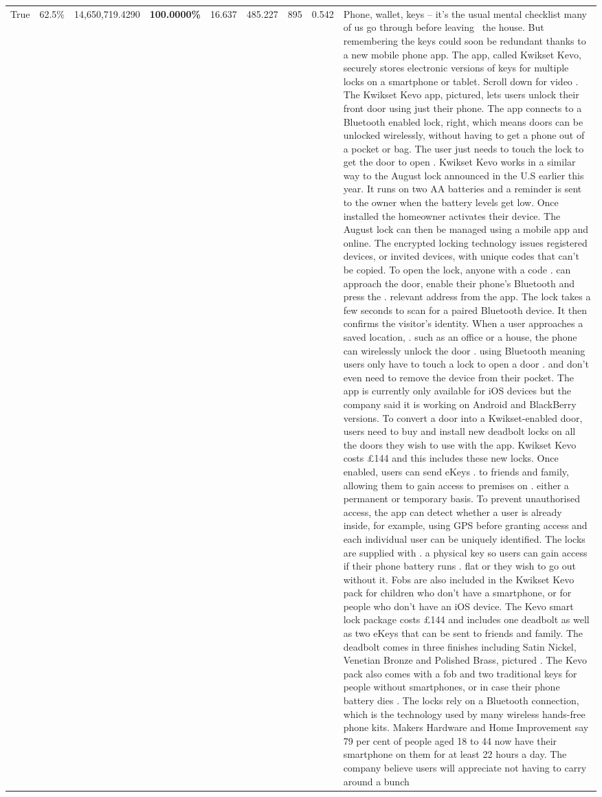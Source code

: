 \begin{table}[H]
\begin{tabular}{lllrlllll}
True & 62.5\% & 14,650,719.4290 & \bfseries \color{red} 100.0000\% & 16.637 & 485.227 & 895 & 0.542 & Phone, wallet, keys – it’s the usual mental checklist many of us go through before leaving  the house. But remembering the keys could soon be redundant thanks to a new mobile phone app. The app, called Kwikset Kevo, securely stores electronic versions of keys for multiple locks on a smartphone or tablet. Scroll down for video . The Kwikset Kevo app, pictured, lets users unlock their front door using just their phone. The app connects to a Bluetooth enabled lock, right, which means doors can be unlocked wirelessly, without having to get a phone out of a pocket or bag. The user just needs to touch the lock to get the door to open . Kwikset Kevo works in a similar way to the August lock announced in the U.S earlier this year. It runs on two AA batteries and a reminder is sent to the owner when the battery levels get low. Once installed the homeowner activates their device. The August lock can then be managed using a mobile app and online. The encrypted locking technology issues registered devices, or invited devices, with unique codes that can't be copied. To open the lock, anyone with a code . can approach the door, enable their phone's Bluetooth and press the . relevant address from the app. The lock takes a few seconds to scan for a paired Bluetooth device. It then confirms the visitor's identity. When a user approaches a saved location, . such as an office or a house, the phone can wirelessly unlock the door . using Bluetooth meaning users only have to touch a lock to open a door . and don't even need to remove the device from their pocket. The app is currently only available for iOS devices but the company said it is working on Android and BlackBerry versions. To convert a door into a Kwikset-enabled door, users need to buy and install new deadbolt locks on all the doors they wish to use with the app. Kwikset Kevo costs £144 and this includes these new locks. Once enabled, users can send eKeys . to friends and family, allowing them to gain access to premises on . either a permanent or temporary basis. To prevent unauthorised access, the app can detect whether a user is already inside, for example, using GPS before granting access and each individual user can be uniquely identified. The locks are supplied with . a physical key so users can gain access if their phone battery runs . flat or they wish to go out without it. Fobs are also included in the Kwikset Kevo pack for children who don't have a smartphone, or for people who don't have an iOS device. The Kevo smart lock package costs £144 and includes one deadbolt as well as two eKeys that can be sent to friends and family. The deadbolt comes in three finishes including Satin Nickel, Venetian Bronze and Polished Brass, pictured . The Kevo pack also comes with a fob and two traditional keys for people without smartphones, or in case their phone battery dies . The locks rely on a Bluetooth connection, which is the technology used by many wireless hands-free phone kits. Makers Hardware and Home Improvement say 79 per cent of people aged 18 to 44 now have their smartphone on them for at least 22 hours a day. The company believe users will appreciate not having to carry around a bunch 
\end{tabular}
\end{table}
